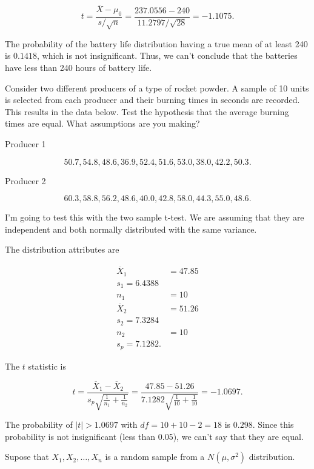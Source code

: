 \documentclass[answers]{exam}
\begin{document}
\begin{questions}
\begin{solution}
\[
t = \frac{\overline{X} - \mu_0}{s / \sqrt{n}} = \frac{237.0556 - 240}{11.2797 /
\sqrt{28}} = -1.1075
.\] 

The probability of the battery life distribution having a true mean of at least
240 is $0.1418$, which is not insignificant. Thus, we can't conclude that the
batteries have less than 240 hours of battery life.
\end{solution}

\question [25] Consider two different producers of a type of rocket powder. A
sample of 10 units is selected from each producer and their burning times in
seconds are recorded. This results in the data below. Test the hypothesis that
the average burning times are equal. What assumptions are you making?

Producer 1

\[
50.7, 54.8, 48.6, 36.9, 52.4, 51.6, 53.0, 38.0, 42.2, 50.3
.\] 

Producer 2

\[
60.3, 58.8, 56.2, 48.6, 40.0, 42.8, 58.0, 44.3, 55.0, 48.6
.\] 

\begin{solution}
I'm going to test this with the two sample t-test. We are assuming that they are
independent and both normally distributed with the same variance.

The distribution attributes are 

\begin{align*}
    \overline{X}_{1} &= 47.85 \\ 
    s_1 = 6.4388 \\
    n_1 &= 10 \\
    \overline{X}_{2} &= 51.26 \\ 
    s_2 = 7.3284 \\
    n_2 &= 10 \\ 
    s_{p} = 7.1282
.\end{align*}

The $t$ statistic is

\[
t = \frac{\overline{X}_{1} - \overline{X}_{2}}{s_{p}\sqrt{\frac{1}{n_1} + \frac{1}{n_2}}} 
= \frac{47.85 - 51.26}{7.1282 \sqrt{\frac{1}{10} + \frac{1}{10}}} 
= -1.0697
.\] 

The probability of $|t| > 1.0697$ with $df=10 + 10 - 2 = 18$ is $0.298$. Since this
probability is not insignificant (less than 0.05), we can't say that they are
equal.
\end{solution}

\question [25] Supose that $X_1,X_2,\ldots,X_{n}$ is a random sample from a
$N(\mu, \sigma^2)$ distribution.


\end{questions}
\end{document}
